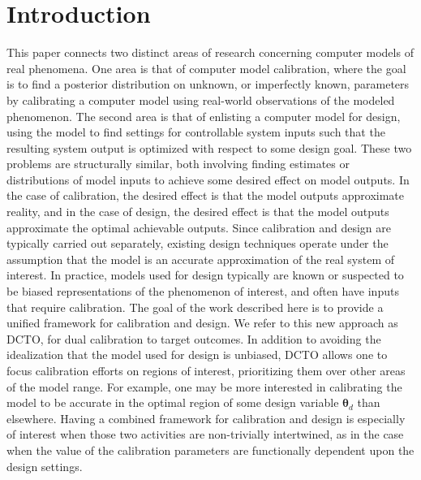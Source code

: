 \documentclass[twocolumn,10pt]{asme2ej}
\begin{document}

\section{Introduction}\label{sec:introduction}

%
This paper connects two distinct areas of research concerning computer models of real phenomena.
%
One area is that of computer model calibration, where the goal is to find a posterior distribution on unknown, or imperfectly known, parameters by calibrating a computer model using real-world observations of the modeled phenomenon.
%
The second area is that of enlisting a computer model for design, using the model to find settings for controllable system inputs such that the resulting system output is optimized with respect to some design goal.
%
These two problems are structurally similar, both involving finding estimates or distributions of model inputs to achieve some desired effect on model outputs.
%
In the case of calibration, the desired effect is that the model outputs approximate reality, and in the case of design, the desired effect is that the model outputs approximate the optimal achievable outputs.
%
Since calibration and design are typically carried out separately, existing design techniques operate under the assumption that the model is an accurate approximation of the real system of interest.
%
In practice, models used for design typically are known or suspected to be biased representations of the phenomenon of interest, and often have inputs that require calibration.
%
The goal of the work described here is to provide a unified framework for calibration and design.
%
We refer to this new approach as DCTO, for dual calibration to target outcomes.
%
In addition to avoiding the idealization that the model used for design is unbiased, DCTO allows one to focus calibration efforts on regions of interest, prioritizing them over other areas of the model range.
%
For example, one may be more interested in calibrating the model to be accurate in the optimal region of some design variable $\boldsymbol \theta_d$ than elsewhere.
%
Having a combined framework for calibration and design is especially of interest when those two activities are non-trivially intertwined, as in the case when the value of the calibration parameters are functionally dependent upon the design settings.
%
\end{document}
